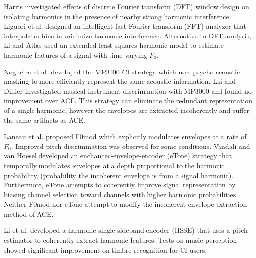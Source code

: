 \documentclass [11pt, proquest,oneside] {ganter_thesis}[2015/03/03]
\begin{document}
Harris \cite{harris1978use} investigated effects of discrete Fourier transform (DFT) window design on isolating harmonics in the presence of nearby strong harmonic interference.  Liguori et al. \cite{liguori2004intelligent} designed an intelligent fast Fourier transform (FFT)-analyzer that interpolates bins to minimize harmonic interference.  Alternative to DFT analysis, Li and Atlas \cite{li2003time} used an extended least-squares harmonic model to estimate harmonic features of a signal with time-varying $F_0$.

Nogueira et al. \cite{nogueira2005psychoacoustic} developed the MP3000 CI strategy which uses psycho-acoustic masking to more efficiently represent the same acoustic information.  Lai and Dillier \cite{lai2008investigating} investigated musical instrument discrimination with MP3000 and found no improvement over ACE.  This strategy can eliminate the redundant representation of a single harmonic, however the envelopes are extracted incoherently and suffer the same artifacts as ACE.

Laneau et al. \cite{laneau2006improved} proposed F0mod which explicitly modulates envelopes at a rate of $F_0$.  Improved pitch discrimination was observed for some conditions.  Vandali and van Hoesel \cite{vandali2011development} developed an enchanced-envelope-encoder (eTone) strategy that temporally modulates envelopes at a depth proportional to the harmonic probability, (probability the incoherent envelope is from a signal harmonic).  Furthermore, eTone attempts to coherently improve signal representation by biasing channel selection toward channels with higher harmonic probabilities.  Neither F0mod nor eTone attempt to modify the incoherent envelope extraction method of ACE.

Li et al. \cite{li2010harmonic} developed a harmonic single sideband encoder (HSSE) that uses a pitch estimator to coherently extract harmonic features.  Tests on music perception \cite{li2013improved} showed significant improvement on timbre recognition for CI users.




\end{document}
